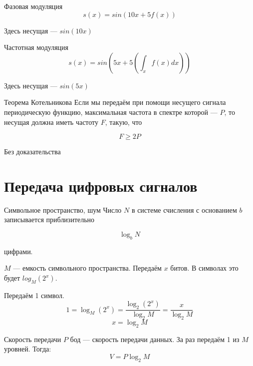 \documentclass[xetex,aspectratio=43]{beamer}
\begin{document}
\begin{frame}{Фазовая модуляция}
	\[s(x) = sin(10x+5f(x))\]

	\begin{center}
		
	\end{center}


	Здесь несущая --- \(sin(10 x)\)
\end{frame}

\begin{frame}{Частотная модуляция}
	\[s(x) = sin\left(5x+5\left(\int_x f\left( x\right) dx \right)\right)\]

	\begin{center}
		
	\end{center}

	Здесь несущая --- \(sin(5 x)\)
\end{frame}

\begin{frame}{Теорема Котельникова}
	Если мы передаём при помощи несущего сигнала периодическую функцию,
	максимальная частота в спектре которой --- \(P\), то несущая должна
	иметь частоту \(F\), такую, что

	\[F \ge 2P\]

	Без доказательства
\end{frame}

\section{Передача цифровых сигналов}

\begin{frame}{Символьное пространство, шум}
	Число \(N\) в системе счисления с основанием \(b\) записывается
	приблизительно

	\[\log_b N\]

	цифрами.

	\pause

	\(M\) --- емкость символьного пространства. Передаём \(x\) битов. В
	символах это будет \(log_M (2^x)\).

	Передаём 1 символ.
	\[1 = \log_M (2^x) = \frac{\log_2 (2^x)}{\log_2 M} = \frac{x}{\log_2 M}\]
	\[x = \log_2 M\]
\end{frame}

\begin{frame}{Скорость передачи}
	\(P\) бод --- скорость передачи данных. За раз передаём 1 из \(M\)
	уровней. Тогда: \[V = P \log_2 M\]
\end{frame}
\end{document}
